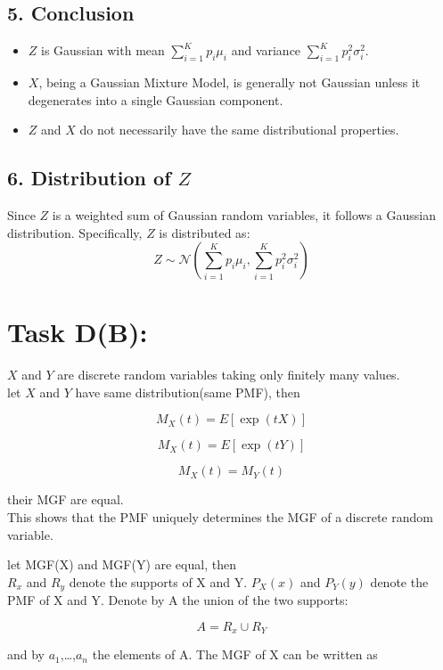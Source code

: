 \documentclass{article}
\begin{document}
\subsection*{5. Conclusion}

\begin{itemize}
    \item \( Z \) is Gaussian with mean \( \sum_{i=1}^K p_i \mu_i \) and variance \( \sum_{i=1}^K p_i^2 \sigma_i^2 \).
    \item \( X \), being a Gaussian Mixture Model, is generally not Gaussian unless it degenerates into a single Gaussian component.
    \item \( Z \) and \( X \) do not necessarily have the same distributional properties.
\end{itemize}

\subsection*{6. Distribution of \( Z \)}


Since \( Z \) is a weighted sum of Gaussian random variables, it follows a Gaussian distribution. Specifically, \( Z \) is distributed as:
\[
Z \sim \mathcal{N} \left( \sum_{i=1}^K p_i \mu_i, \sum_{i=1}^K p_i^2 \sigma_i^2 \right)
\]

\section*{Task D(B):}
\(X\) and \(Y\) are discrete random variables taking only finitely many values. \\
let \(X\) and \(Y\) have same distribution(same PMF), then

\[
M_X(t) = E[\exp(tX)]
\]

\[
M_X(t) = E[\exp(tY)]
\]

\[
M_X(t) = M_Y(t)
\]

their MGF are equal. \\
This shows that the PMF uniquely determines the MGF of a discrete random variable.

let MGF(X) and MGF(Y) are equal, then
\\
\(R_x\) and \(R_y\) denote the supports of X and Y. \(P_X(x)\) and \(P_Y(y)\) denote the PMF of X and Y. Denote by A the union of the two supports:

\[
A = R_x \cup R_Y
\]

and by \(a_1\),\dots,\(a_n\) the elements of A. The MGF of X can be written as \\
\end{document}
